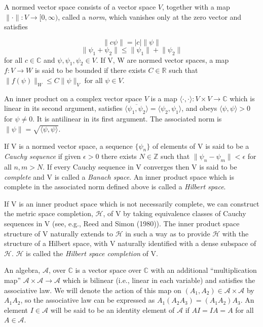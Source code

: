 \documentclass[11pt,a4paper]{article}
\begin{document}
A normed vector space consists of a vector space \(V\), together with a map \(\lVert\cdot\rVert:V\to[0,\infty)\), called a \emph{norm}, which vanishes only at the zero vector and satisfies

\hypertarget{source-202}{}
\begin{equation*}
\lVert c\psi\rVert = |c| \lVert \psi\rVert \tag{A.1.5}\label{eq:A.1.5}
\end{equation*}
\begin{equation*}
\lVert \psi_1 + \psi_2\rVert \le \lVert \psi_1\rVert + \lVert \psi_2\rVert \tag{A.1.6}\label{eq:A.1.6}
\end{equation*}
for all \(c \in \mathbb{C}\) and \(\psi, \psi_1, \psi_2 \in V\). If V, W are normed vector spaces, a map \(f: V \to W\) is said to be bounded if there exists \(C \in \mathbb{R}\) such that \(\lVert f(\psi)\rVert_W \le C\lVert \psi\rVert_V\) for all \(\psi \in V\).

An inner product on a complex vector space \(V\) is a map \(\langle\cdot,\cdot\rangle:V\times V\to\mathbb{C}\) which is linear in its second argument, satisfies \(\overline{\langle\psi_1,\psi_2\rangle}=\langle\psi_2,\psi_1\rangle\), and obeys \(\langle\psi,\psi\rangle>0\) for \(\psi\ne0\). It is antilinear in its first argument. The associated norm is \(\lVert\psi\rVert=\sqrt{\langle\psi,\psi\rangle}\).

If V is a normed vector space, a sequence \(\{\psi_n\}\) of elements of V is said to be a \emph{Cauchy sequence} if given \(\epsilon > 0\) there exists \(N \in \mathbb{Z}\) such that \(\lVert \psi_n - \psi_m\rVert < \epsilon\) for all \(n,m>N\). If every Cauchy sequence in V converges then V is said to be \emph{complete} and V is called a \emph{Banach space}. An inner product space which is complete in the associated norm defined above is called a \emph{Hilbert space}.

If V is an inner product space which is not necessarily complete, we can construct the metric space completion, \(\mathcal{H}\), of V by taking equivalence classes of Cauchy sequences in V (see, e.g., Reed and Simon (1980)). The inner product space structure of V naturally extends to \(\mathcal{H}\) in such a way as to provide \(\mathcal{H}\) with the structure of a Hilbert space, with V naturally identified with a dense subspace of \(\mathcal{H}\). \(\mathcal{H}\) is called the \emph{Hilbert space completion} of V.

An algebra, \(\mathcal{A}\), over \(\mathbb C\) is a vector space over \(\mathbb C\) with an additional ``multiplication map'' \(\mathcal{A} \times \mathcal{A} \to \mathcal{A}\) which is bilinear (i.e., linear in each variable) and satisfies the associative law. We will denote the action of this map on \((A_1,A_2) \in \mathcal{A} \times \mathcal{A}\) by \(A_1A_2\), so the associative law can be expressed as \(A_1(A_2A_3) = (A_1A_2)A_3\). An element \(I \in \mathcal{A}\) will be said to be an identity element of \(\mathcal{A}\) if \(AI=IA=A\) for all \(A \in \mathcal{A}\).
\end{document}
